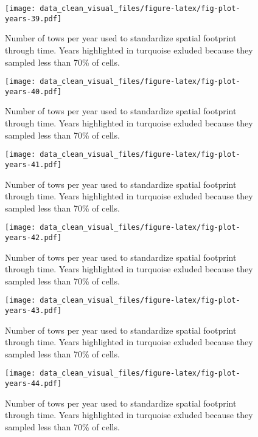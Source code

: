 \documentclass[
]{article}
\begin{document}
\begin{figure}
\centering
\texttt{[image: data\_clean\_visual\_files/figure-latex/fig-plot-years-39.pdf]}
\caption{\label{fig:fig-plot-years-39}Number of tows per year used to standardize spatial footprint through time. Years highlighted in turquoise exluded because they sampled less than 70\% of cells.}
\end{figure}

\begin{figure}
\centering
\texttt{[image: data\_clean\_visual\_files/figure-latex/fig-plot-years-40.pdf]}
\caption{\label{fig:fig-plot-years-40}Number of tows per year used to standardize spatial footprint through time. Years highlighted in turquoise exluded because they sampled less than 70\% of cells.}
\end{figure}

\begin{figure}
\centering
\texttt{[image: data\_clean\_visual\_files/figure-latex/fig-plot-years-41.pdf]}
\caption{\label{fig:fig-plot-years-41}Number of tows per year used to standardize spatial footprint through time. Years highlighted in turquoise exluded because they sampled less than 70\% of cells.}
\end{figure}

\begin{figure}
\centering
\texttt{[image: data\_clean\_visual\_files/figure-latex/fig-plot-years-42.pdf]}
\caption{\label{fig:fig-plot-years-42}Number of tows per year used to standardize spatial footprint through time. Years highlighted in turquoise exluded because they sampled less than 70\% of cells.}
\end{figure}

\begin{figure}
\centering
\texttt{[image: data\_clean\_visual\_files/figure-latex/fig-plot-years-43.pdf]}
\caption{\label{fig:fig-plot-years-43}Number of tows per year used to standardize spatial footprint through time. Years highlighted in turquoise exluded because they sampled less than 70\% of cells.}
\end{figure}

\begin{figure}
\centering
\texttt{[image: data\_clean\_visual\_files/figure-latex/fig-plot-years-44.pdf]}
\caption{\label{fig:fig-plot-years-44}Number of tows per year used to standardize spatial footprint through time. Years highlighted in turquoise exluded because they sampled less than 70\% of cells.}
\end{figure}
\end{document}
